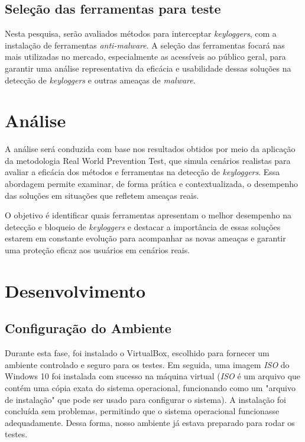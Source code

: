 \documentclass[12pt]{article}
\begin{document}
\subsection{Seleção das ferramentas para teste}
Nesta pesquisa, serão avaliados métodos para interceptar \textit{keyloggers}, com a instalação de ferramentas \textit{anti-malware}. A seleção das ferramentas focará nas mais utilizadas no mercado, especialmente as acessíveis ao público geral, para garantir uma análise representativa da eficácia e usabilidade dessas soluções na detecção de \textit{keyloggers} e outras ameaças de \textit{malware}.

\section{Análise}
A análise será conduzida com base nos resultados obtidos por meio da aplicação da metodologia Real World Prevention Test, que simula cenários realistas para avaliar a eficácia dos métodos e ferramentas na detecção de \textit{keyloggers}. Essa abordagem permite examinar, de forma prática e contextualizada, o desempenho das soluções em situações que refletem ameaças reais.

O objetivo é identificar quais ferramentas apresentam o melhor desempenho na detecção e bloqueio de \textit{keyloggers} e destacar a importância de essas soluções estarem em constante evolução para acompanhar as novas ameaças e garantir uma proteção eficaz aos usuários em cenários reais.

\section{Desenvolvimento}

\subsection{Configuração do Ambiente}

Durante esta fase, foi instalado o VirtualBox, escolhido para fornecer um ambiente controlado e seguro para os testes. Em seguida, uma imagem \textit{ISO} do Windows 10 foi instalada com sucesso na máquina virtual (\textit{ISO} é um arquivo que contém uma cópia exata do sistema operacional, funcionando como um "arquivo de instalação" que pode ser usado para configurar o sistema). A instalação foi concluída sem problemas, permitindo que o sistema operacional funcionasse adequadamente. Dessa forma, nosso ambiente já estava preparado para rodar os testes.
\end{document}

